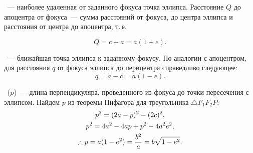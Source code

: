~--- наиболее удаленная от заданного фокуса точка эллипса. Расстояние $Q$ до апоцентра от фокуса~--- сумма расстояний от фокуса, до центра эллипса и расстояния от центра до апоцентра, т.\,е.

\begin{equation}
    Q = c + a = a (1 + e).
\end{equation}

~--- ближайшая точка эллипса к заданному фокусу. По аналогии с апоцентром, для расстояния $q$ от фокуса эллипса до перицентра справедливо следующее:
\begin{equation}
    q = a - c = a (1 - e).
\end{equation}

~($p$)~--- длина перпендикуляра, проведенного из фокуса до точки пересечения с эллипсом. Найдем $p$ из теоремы Пифагора для треугольника $\triangle F_1 F_2 P$:
\begin{gather}
    p^2 = (2a - p)^2 - (2c)^2, \notag\\
    p^2 =  4a^2 - 4ap + p^2 - 4a^2e^2,\notag\\
    \therefore p = a (1 - e^2) = \frac{b^2}{a} = b \sqrt{1 - e^2}.
\end{gather}


